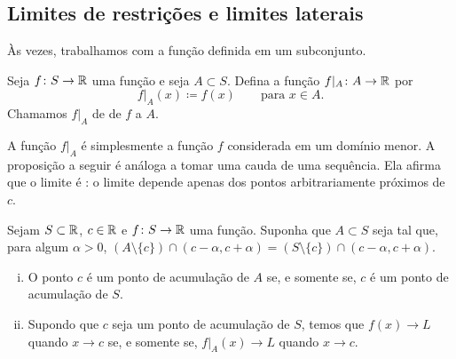 \subsection{Limites de restrições e limites laterais}

Às vezes, trabalhamos com a função definida em um subconjunto.

\begin{defn}
Seja $f \colon S \to {\mathbb{R}}$ uma função e seja $A \subset S$. Defina a
função $f|_A \colon A \to {\mathbb{R}}$ por
\begin{equation*}
f|_A (x) \coloneqq f(x)  \qquad \text{para } x \in A.
\end{equation*}
Chamamos $f|_A$ de \emph{} de $f$ a $A$.
\end{defn}

A função $f|_A$ é simplesmente a função $f$ considerada em um domínio menor.
A proposição a seguir é análoga a tomar uma cauda de uma sequência.
Ela afirma que o limite é : o limite depende apenas dos pontos
arbitrariamente próximos de $c$.

\begin{prop} \label{prop:limrest}
Sejam $S \subset {\mathbb{R}}$, $c \in {\mathbb{R}}$ e
$f \colon S
\to {\mathbb{R}}$ uma função.
Suponha que
$A \subset S$ seja tal que, para algum $\alpha > 0$,
$(A \setminus \{ c \}) \cap (c-\alpha,c+\alpha) = (S \setminus \{ c \}) \cap (c-\alpha,c+\alpha)$.
\begin{enumerate}[(i)]
\item O ponto $c$ é um ponto de acumulação de $A$ se, e somente se, $c$ é um ponto de acumulação
de $S$.
\item Supondo que $c$ seja um ponto de acumulação de $S$, temos que
$f(x) \to L$ quando $x \to c$ se, e somente se,
$f|_A(x) \to L$ quando $x \to c$.
\end{enumerate}
\end{prop}

